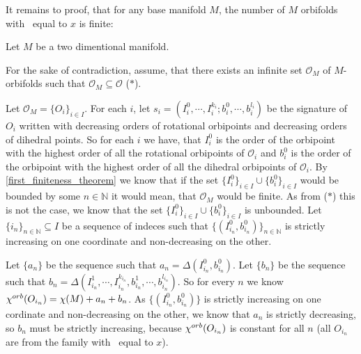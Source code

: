 It remains to proof, that for any base manifold $M$, the number of $M$ orbifolds 
with \Eoc\ equal to $x$ is finite: 

Let $M$ be a two dimentional manifold. 

For the sake of contradiction, assume, that there exists an infinite set $\mathcal{O}_M$
of $M$-orbifolds such that $\mathcal{O}_M \subseteq \mathcal{O}$ ($\ast$).

Let $\mathcal{O}_M = \{O_i\}_{i \in I}$. 
For each $i$, let $s_i = (I^0_i, \cdots, I^{k_i}_i; b^0_i, \cdots, b^{l_i}_i)$ be the signature 
of $O_i$ written with decreasing orders of rotational orbipoints and decreasing orders of 
dihedral points. So for each $i$ we have, that $I^0_i$ is 
the order of the orbipoint with the highest order of all the rotational orbipoints of 
$\mathcal{O}_i$ and $b^0_i$ is 
the order of the orbipoint with the highest order of all the dihedral orbipoints of 
$\mathcal{O}_i$. 
By \ref{first_finiteness_theorem} we know that if the set $\{I^0_i\}_{i \in I} \cup 
\{b^0_i\}_{i \in I}$ 
would be bounded 
by some $n \in \mathbb{N}$ it would mean, that $\mathcal{O}_M$ would be finite. As 
from ($\ast$) this is not the case, we know
that the set $\{I^0_i\}_{i \in I} \cup \{b^0_i\}_{i \in I}$ is unbounded. 
Let $\{i_n\}_{n\in \mathbb{N}} \subseteq I$ be a sequence of indeces such that
$\{(I^0_{i_n}, b^0_{i_n})\}_{n\in \mathbb{N}}$ is strictly increasing on one coordinate 
and non-decreasing on the other. 

Let $\{a_n\}$ be the sequence such that $a_n = \Delta(I^0_{i_n},b^0_{i_n})$.
Let $\{b_n\}$ be the sequence such that $b_n = \Delta(I^1_{i_n},\cdots,
I^{k_{i_n}}_{i_n}, b^1_{i_n},
\cdots, b^{l_{i_n}}_{i_n})$. 
So for every $n$ we know ${\chi^{orb}(O_{i_n})} = \chi(M) + a_n + b_n$. As $\{(I^0_{i_n}, b^0_{i_n})\}$ 
is strictly 
increasing on one cordinate and non-decreasing on the other, we know 
that $a_n$ is strictly decreasing, so $b_n$ must be strictly 
increasing,  
because ${\chi^{orb}(O_{i_n})}$ is constant for all $n$ (all $O_{i_n}$ 
are from the family with \Eoc\ equal to $x$). 

